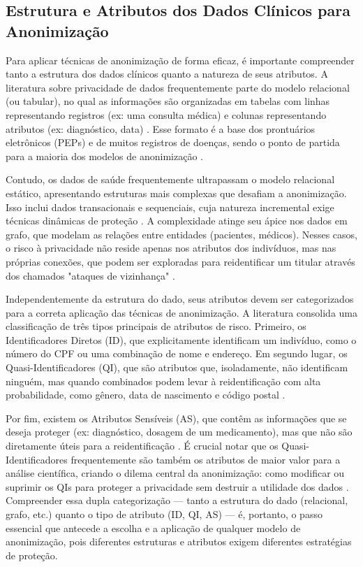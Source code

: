 \subsection{Estrutura e Atributos dos Dados Clínicos para Anonimização}
\label{subsec:fund-dados-categorizacao}

Para aplicar técnicas de anonimização de forma eficaz, é importante compreender tanto a estrutura dos dados clínicos quanto a natureza de seus atributos. A literatura sobre privacidade de dados frequentemente parte do modelo relacional (ou tabular), no qual as informações são organizadas em tabelas com linhas representando registros (ex: uma consulta médica) e colunas representando atributos (ex: diagnóstico, data) \cite{Olatunji2024}. Esse formato é a base dos prontuários eletrônicos (PEPs) e de muitos registros de doenças, sendo o ponto de partida para a maioria dos modelos de anonimização \cite{Zuo2021Data}.

Contudo, os dados de saúde frequentemente ultrapassam o modelo relacional estático, apresentando estruturas mais complexas que desafiam a anonimização. Isso inclui dados transacionais e sequenciais, cuja natureza incremental exige técnicas dinâmicas de proteção \cite{Zuo2021Data, Olatunji2024}. A complexidade atinge seu ápice nos dados em grafo, que modelam as relações entre entidades (pacientes, médicos). Nesses casos, o risco à privacidade não reside apenas nos atributos dos indivíduos, mas nas próprias conexões, que podem ser exploradas para reidentificar um titular através dos chamados "ataques de vizinhança" \cite{Olatunji2024}.

Independentemente da estrutura do dado, seus atributos devem ser categorizados para a correta aplicação das técnicas de anonimização. A literatura consolida uma classificação de três tipos principais de atributos de risco. Primeiro, os Identificadores Diretos (ID), que explicitamente identificam um indivíduo, como o número do CPF ou uma combinação de nome e endereço. Em segundo lugar, os Quasi-Identificadores (QI), que são atributos que, isoladamente, não identificam ninguém, mas quando combinados podem levar à reidentificação com alta probabilidade, como gênero, data de nascimento e código postal \cite{Zuo2021Data, Olatunji2024}.

Por fim, existem os Atributos Sensíveis (AS), que contêm as informações que se deseja proteger (ex: diagnóstico, dosagem de um medicamento), mas que não são diretamente úteis para a reidentificação \cite{Zuo2021Data}. É crucial notar que os Quasi-Identificadores frequentemente são também os atributos de maior valor para a análise científica, criando o dilema central da anonimização: como modificar ou suprimir os QIs para proteger a privacidade sem destruir a utilidade dos dados \cite{Zuo2021Data}. Compreender essa dupla categorização — tanto a estrutura do dado (relacional, grafo, etc.) quanto o tipo de atributo (ID, QI, AS) — é, portanto, o passo essencial que antecede a escolha e a aplicação de qualquer modelo de anonimização, pois diferentes estruturas e atributos exigem diferentes estratégias de proteção.

